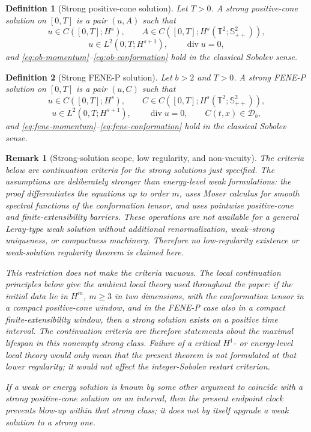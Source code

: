 \documentclass[11pt]{article}
\newtheorem{definition}{Definition}[section]
\newtheorem{remark}{Remark}[section]
\newcommand{\T}{\mathbb T}
\newcommand{\Spp}{\mathbb S_{++}}
\newcommand{\divv}{\operatorname{div}}
\newcommand{\calD}{\mathcal D}
\begin{document}
\begin{definition}[Strong positive-cone solution]
Let \(T>0\).  A strong positive-cone solution on \([0,T]\) is a pair
\((u,A)\) such that
\[
  u\in C([0,T];H^s),\qquad
  A\in C([0,T];H^s(\T^2;\Spp^2)),
\]
\[
  u\in L^2(0,T;H^{s+1}),\qquad \divv u=0,
\]
and \eqref{eq:ob-momentum}--\eqref{eq:ob-conformation} hold in the classical
Sobolev sense.
\end{definition}

\begin{definition}[Strong FENE-P solution]
Let \(b>2\) and \(T>0\).  A strong FENE-P solution on \([0,T]\) is a pair \((u,C)\) such
that
\[
  u\in C([0,T];H^s),\qquad
  C\in C([0,T];H^s(\T^2;\Spp^2)),
\]
\[
  u\in L^2(0,T;H^{s+1}),\qquad \divv u=0,\qquad C(t,x)\in\calD_b,
\]
and \eqref{eq:fene-momentum}--\eqref{eq:fene-conformation} hold in the
classical Sobolev sense.
\end{definition}

\begin{remark}[Strong-solution scope, low regularity, and non-vacuity]
\label{rem:strong-solution-scope}
The criteria below are continuation criteria for the strong solutions just
specified.  The assumptions are deliberately stronger than energy-level weak
formulations: the proof differentiates the equations up to order \(m\), uses
Moser calculus for smooth spectral functions of the conformation tensor, and
uses pointwise positive-cone and finite-extensibility barriers.  These operations
are not available for a general Leray-type weak solution without additional
renormalization, weak--strong uniqueness, or compactness machinery.  Therefore
no low-regularity existence or weak-solution regularity theorem is claimed here.

This restriction does not make the criteria vacuous.  The local continuation
principles below give the ambient local theory used throughout the paper: if the
initial data lie in \(H^m\), \(m\ge3\) in two dimensions, with the conformation
tensor in a compact positive-cone window, and in the FENE-P case also in a
compact finite-extensibility window, then a strong solution exists on a positive
time interval.  The continuation criteria are therefore statements about the
maximal lifespan in this nonempty strong class.  Failure of a critical \(H^1\)-
or energy-level local theory would only mean that the present theorem is not
formulated at that lower regularity; it would not affect the integer-Sobolev
restart criterion.

If a weak or energy solution is known by some other argument to coincide with a
strong positive-cone solution on an interval, then the present endpoint clock
prevents blow-up within that strong class; it does not by itself upgrade a weak
solution to a strong one.
\end{remark}
\end{document}
